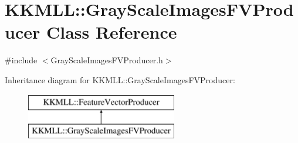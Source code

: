 \hypertarget{class_k_k_m_l_l_1_1_gray_scale_images_f_v_producer}{}\section{K\+K\+M\+LL\+:\+:Gray\+Scale\+Images\+F\+V\+Producer Class Reference}
\label{class_k_k_m_l_l_1_1_gray_scale_images_f_v_producer}


{\ttfamily \#include $<$Gray\+Scale\+Images\+F\+V\+Producer.\+h$>$}

Inheritance diagram for K\+K\+M\+LL\+:\+:Gray\+Scale\+Images\+F\+V\+Producer\+:\begin{figure}[H]
\begin{center}
\leavevmode
\includegraphics[height=2.000000cm]{class_k_k_m_l_l_1_1_gray_scale_images_f_v_producer}
\end{center}
\end{figure}
